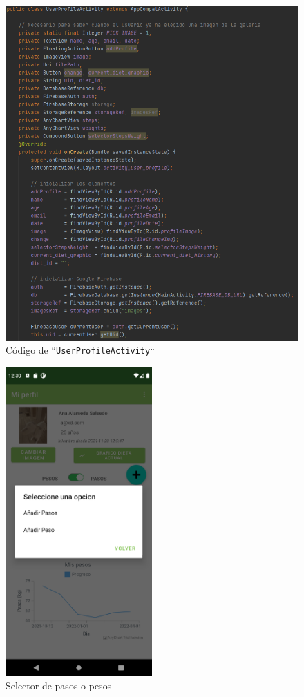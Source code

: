 \begin{figure}[H]
    \centering
    \includegraphics[width=\textwidth]{Images/Capitulo7/userprofileactivity.png}
        \caption{Código de ``\texttt{UserProfileActivity}``}
    \label{fig:userprofileactivity}
\end{figure}

\begin{figure}[H]
    \centering
    \includegraphics[width=0.5\textwidth]{Images/Capitulo7/selectorperf.png}
    \caption{Selector de pasos o pesos}
    \label{fig:selectorperf}
\end{figure}

